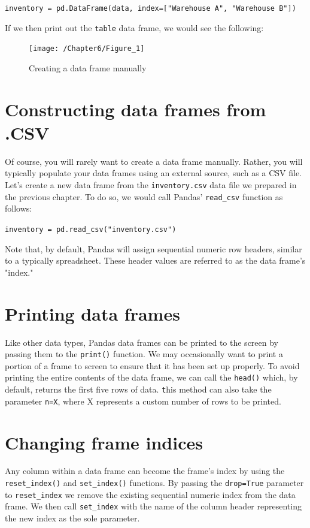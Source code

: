 \documentclass{book}
\begin{document}
\texttt{inventory = pd.DataFrame(data, index=["Warehouse A", "Warehouse B"])}

If we then print out the \texttt{table} data frame, we would see the following:

\begin{figure}[h]
	\caption{Creating a data frame manually}
	\centering\texttt{[image: /Chapter6/Figure\_1]}
\end{figure}

\section{Constructing data frames from .CSV}
Of course, you will rarely want to create a data frame manually. Rather, you will typically populate your data frames using an external source, such as a CSV file. Let's create a new data frame from the \texttt{inventory.csv} data file we prepared in the previous chapter. To do so, we would call Pandas' \texttt{read\_csv} function as follows:

\texttt{inventory = pd.read\_csv("inventory.csv")}

Note that, by default, Pandas will assign sequential numeric row headers, similar to a typically spreadsheet. These header values are referred to as the data frame's "index."

\section{Printing data frames}
Like other data types, Pandas data frames can be printed to the screen by passing them to the \texttt{print()} function. We may occasionally want to print a portion of a frame to screen to ensure that it has been set up properly. To avoid printing the entire contents of the data frame, we can call the \texttt{head()} which, by default, returns the first five rows of data. \texttt this method can also take the parameter \texttt{n=X}, where X represents a custom number of rows to be printed.

\section{Changing frame indices}

Any column within a data frame can become the frame's index by using the \texttt{reset\_index()} and \texttt{set\_index()} functions. By passing the \texttt{drop=True} parameter to \texttt{reset\_index} we remove the existing sequential numeric index from the data frame. We then call \texttt{set\_index} with the name of the column header representing the new index as the sole parameter. 
\end{document}

